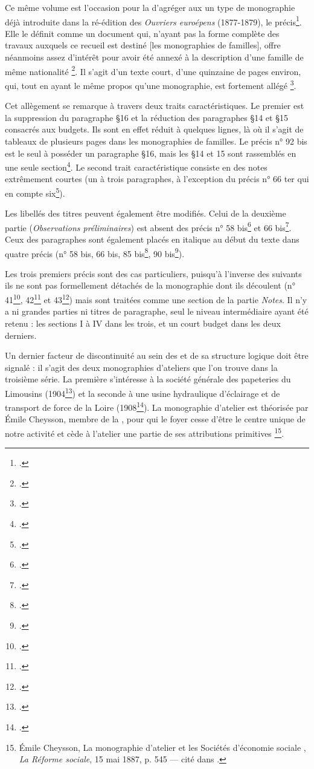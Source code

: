 Ce même volume est l'occasion pour la \sess{} d'agréger aux \odm{} un type de monographie déjà introduite dans la ré-édition des \textit{Ouvriers euroépens} (1877-1879), le précis\footcite[p. 102]{lorry}. Elle le définit comme un document qui, \og n'ayant pas la forme complète des travaux auxquels ce recueil est destiné [les monographies de familles], offre néanmoins assez d'intérêt pour avoir été annexé à la description d'une famille de même nationalité \fg{}\footcite[p. II]{averts2t1}. Il s'agit d'un texte court, d'une quinzaine de pages environ, qui, tout en ayant le même propos qu'une monographie, est fortement \og allégé \fg{}\footcite[p. 7]{chenu}.

Cet allègement se remarque à travers deux traits caractéristiques. Le premier est la suppression du paragraphe §16 et la réduction des paragraphes §14 et §15 consacrés aux budgets. Ils sont en effet réduit à quelques lignes, là où il s'agit de tableaux de plusieurs pages dans les  monographies de familles. Le précis n° 92 bis est le seul à posséder un paragraphe §16, mais les §14 et 15 sont rassemblés en une seule section\footcite[p. 78-81]{mono092b}. Le second trait caractéristique consiste en des notes extrêmement courtes (un à trois paragraphes, à l'exception du précis n° 66 ter qui en compte six\footcite[p. 158-172]{mono066c}).

Les libellés des titres peuvent également être modifiés. Celui de la deuxième partie (\textit{Observations préliminaires}) est absent des précis n° 58 bis\footcite[p. 153]{mono058b} et 66 bis\footcite[p. 125]{mono066b}. Ceux des paragraphes sont également placés en italique au début du texte dans quatre précis (n° 58 bis, 66 bis, 85 bis\footcite{mono085b}, 90 bis\footcite{mono090b}).

Les trois premiers précis sont des cas particuliers, puisqu'à l'inverse des suivants ils ne sont pas formellement détachés de la monographie dont ils découlent (n° 41\footcite[p. 188-196]{mono041a}, 42\footcite[246-258]{mono042a} et 43\footcite[p. 300-305]{mono043a}) mais sont traitées comme une section de la partie \textit{Notes}. Il n'y a ni grandes parties ni titres de paragraphe, seul le niveau intermédiaire ayant été retenu : les sections I à IV dans les trois, et un court budget dans les deux derniers.

Un dernier facteur de discontinuité au sein des \odm{} et de sa structure logique doit être signalé : il s'agit des deux monographies d'ateliers que l'on trouve dans la troisième série. La première s'intéresse à la société générale des papeteries du Limousins (1904\footcite{mono472a}) et la seconde à  une usine hydraulique d’éclairage et de transport de force de la Loire (1908\footcite{mono473a}). La monographie d'atelier est théorisée par Émile Cheysson, membre de la \sess, pour qui le \og foyer cesse d'être le centre unique de notre activité et cède à l'atelier une partie de ses attributions primitives \fg{}\footnote{Émile Cheysson, \og La monographie d'atelier et les Sociétés d'économie sociale \fg{}, \textit{La Réforme sociale}, 15 mai 1887, p. 545 --- cité dans \cite[p. 23]{savoye2}.}.

